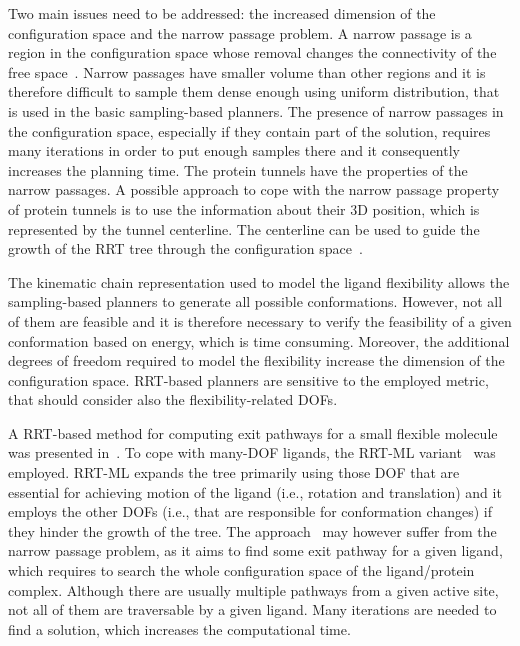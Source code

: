 \documentclass{svmult}
\begin{document}
Two main issues need to be addressed: the increased dimension of the configuration space and the narrow passage problem.
A narrow passage is a region in the configuration space whose removal changes the connectivity of the free space~\cite{hannaWIS}.
Narrow passages have smaller volume than other regions and it is therefore difficult to sample them dense enough using uniform distribution, that is used in the basic sampling-based planners.
The presence of narrow passages in the configuration space, especially if they contain part of the solution, requires many iterations
in order to put enough samples there and it consequently increases the planning time.
The protein tunnels have the properties of the narrow passages. 
A possible approach to cope with the narrow passage property of protein tunnels is to use the information
about their 3D position, which is represented by the tunnel centerline.
The centerline can be used to guide the growth of the RRT tree through the configuration space~\cite{vonasek2009rrt,denny2016dynamic}.

The kinematic chain representation used to model the ligand flexibility allows the sampling-based planners to generate all possible conformations.
However, not all of them are feasible and it is therefore necessary to verify the feasibility of a given conformation based on energy, which is time consuming.
Moreover, the additional degrees of freedom required to model the flexibility increase the dimension of the configuration space.
RRT-based planners are sensitive to the employed metric, that should consider also the flexibility-related DOFs.

A RRT-based method for computing exit pathways for a small flexible molecule was presented in~\cite{cortes2010simulating}.
To cope with many-DOF ligands, the RRT-ML variant~\cite{cortes2007mlrrt} was employed.
RRT-ML expands the tree primarily using those DOF that are essential for achieving motion of the ligand (i.e., rotation
and translation) and it employs the other DOFs (i.e., that are responsible for conformation changes) if they hinder the growth of the tree.
The approach~\cite{cortes2010simulating} may however suffer from the narrow passage problem, as it aims to find some exit pathway for a given ligand, which requires to search the whole configuration space of the ligand/protein complex.
Although there are usually multiple pathways from a given active site, not all of them are traversable by a given ligand.
Many iterations are needed to find a solution, which increases the computational time.
\end{document}
